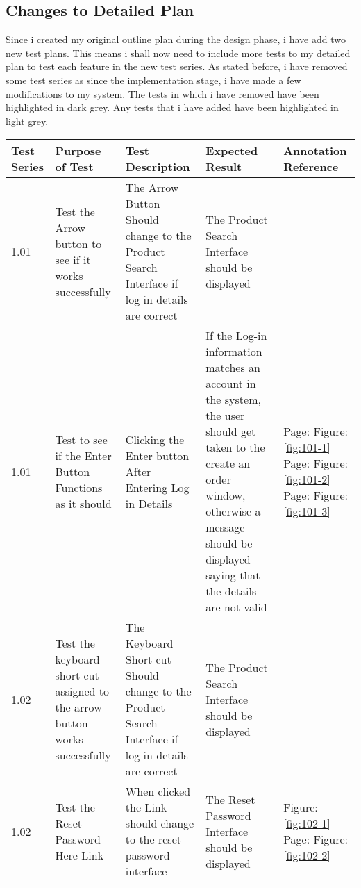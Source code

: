 \subsection{Changes to Detailed Plan}

Since i created my original outline plan during the design phase, i have add two new test plans. This means i shall now need to include more tests to my detailed plan to test each feature in the new test series. As stated before, i have removed some test series as since the implementation stage, i have made a few modifications to my system. The tests in which i have removed have been highlighted in dark grey. Any tests that i have added have been highlighted in light grey.

\begin{flushleft}
\begin{longtable}{|p{1cm}|p{2.5cm}|p{2.5cm}|p{2cm}|p{2cm}|}
        \hline
        \textbf{Test Series} & \textbf{Purpose of Test} & \textbf{Test Description} &  \textbf{Expected Result} & \textbf{Annotation Reference}\\ \hline
	\rowcolor{dark-grey}1.01 & Test the Arrow button to see if it works successfully & The Arrow Button Should change to the Product Search Interface if log in details are correct & The Product Search Interface should be displayed &  \\ \hline
	\rowcolor{light-grey}1.01 & Test to see if the Enter Button Functions as it should & Clicking the Enter button After Entering Log in Details & If the Log-in information matches an account in the system, the user should get taken to the create an order window, otherwise a message should be displayed saying that the details are not valid &  Page:\pageref{fig:101-1}  \newline Figure:\ref{fig:101-1}  \newline  \newline Page:\pageref{fig:101-2}  \newline Figure:\ref{fig:101-2} \newline  \newline Page:\pageref{fig:101-3}  \newline Figure:\ref{fig:101-3}\\ \hline
	\rowcolor{dark-grey}1.02 & Test the keyboard short-cut assigned to the arrow button works successfully & The Keyboard Short-cut Should change to the Product Search Interface if log in details are correct &The Product Search Interface should be displayed &  \\ \hline
	1.02 & Test the Reset Password Here Link & When clicked the Link should change to the reset password interface  & The Reset Password Interface should be displayed &  \newline Figure:\ref{fig:102-1} \newline  \newline  Page:\pageref{fig:102-2}  \newline Figure:\ref{fig:102-2}\\ \hline

\end{longtable}
\end{flushleft}
